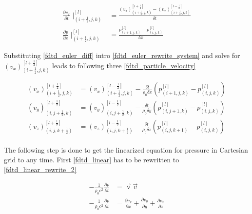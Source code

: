 \begin{subequations}\label{fdtd_euler_diff}
\begin{alignat}{2}
\frac{\partial v_x}{\partial t}\mid _{(i+\frac{1}{2},j,k)}^{[l]} &= \frac{(v_x)_{(i+\frac{1}{2},j,k)}^{[l+\frac{1}{2}]} -(v_x)_{(i+\frac{1}{2},j,k)}^{[l-\frac{1}{2}]}}{\delta t} \label{fdtd_euler_diff_1} \\
\frac{\partial p}{\partial x}\mid _{(i+\frac{1}{2},j,k)}^{[l]} &= \frac{p_{(i+1,j,k)}^{[l]} -p_{(i,j,k)}^{[l]}}{\delta x}  \label{fdtd_linear_diff_2}
\end{alignat}
\end{subequations}

Substituting \autoref{fdtd_euler_diff} intro \autoref{fdtd_euler_rewrite_system} and solve for $(v_x)_{(i+\frac{1}{2},j,k)}^{[l+\frac{1}{2}]}$ leads to following three \autoref{fdtd_particle_velocity}


\begin{subequations}\label{fdtd_particle_velocity}
\begin{alignat}{2}
(v_x)_{(i+\frac{1}{2},j,k)}^{[l+\frac{1}{2}]}&= (v_x)_{(i+\frac{1}{2},j,k)}^{[l-\frac{1}{2}]}-\frac{\delta t}{\rho_0 \delta x} \left( p_{(i+1,j,k)}^{[l]} -p_{(i,j,k)}^{[l]}  \right)\\
(v_y)_{(i,j+\frac{1}{2},k)}^{[l+\frac{1}{2}]}&= (v_y)_{(i,j+\frac{1}{2},k)}^{[l-\frac{1}{2}]}-\frac{\delta t}{\rho_0 \delta y} \left( p_{(i,j+1,k)}^{[l]} -p_{(i,j,k)}^{[l]}  \right)\\
(v_z)_{(i,j,k+\frac{1}{2})}^{[l+\frac{1}{2}]}&= (v_z)_{(i,j,k+\frac{1}{2})}^{[l-\frac{1}{2}]}-\frac{\delta t}{\rho_0 \delta z} \left( p_{(i,j,k+1)}^{[l]} -p_{(i,j,k)}^{[l]}  \right)
\end{alignat}
\end{subequations}
\\

The following step is done to get the linearized equation for pressure in Cartesian grid to any time. First \autoref{fdtd_linear} has to be rewritten to \autoref{fdtd_linear_rewrite_2}

\begin{subequations}\label{fdtd_linear_rewrite}
\begin{alignat}{2}
- \frac{1}{\rho_0c^2} \frac{\partial p}{\partial t} &=\vec{\triangledown }\vec{v} \label{fdtd_linear_rewrite_1}\\
- \frac{1}{\rho_0c^2} \frac{\partial p}{\partial t} &=\frac{\partial v_x}{\partial x}+\frac{\partial v_y}{\partial y}+\frac{\partial v_z}{\partial z}\label{fdtd_linear_rewrite_2}
\end{alignat}
\end{subequations}
\\


